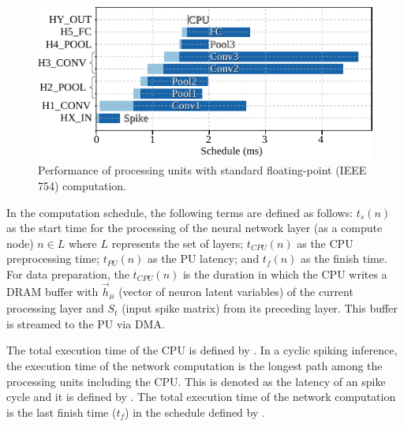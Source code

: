 \begin{figure}[!t]
	\centering
	\includegraphics[width=1\columnwidth]{../figures/latency_pu_fp.pdf}
	\caption{Performance of processing units with standard floating-point (IEEE 754) computation.}
	\label{fig:latency_pu_fp}
\end{figure}

In the computation schedule, the following terms are defined as follows: $t_s(n)$ as the start time for the processing of the neural network layer (as a compute node) $n\in L$ where $L$ represents the set of layers; $t_{CPU}(n)$ as the CPU preprocessing time; $t_{PU}(n)$ as the PU latency; and $t_f(n)$ as the finish time. For data preparation, the $t_{CPU}(n)$ is the duration in which the CPU writes a DRAM buffer with $\vec{h}_\mu$ (vector of neuron latent variables) of the current processing layer and $S_t$ (input spike matrix) from its preceding layer. This buffer is streamed to the PU via DMA.

The total execution time of the CPU is defined by . In a cyclic spiking inference, the execution time of the network computation is the longest path among the processing units including the CPU. This is denoted as the latency of an spike cycle and it is defined by . The total execution time of the network computation is the last finish time ($t_f$) in the schedule defined by .

